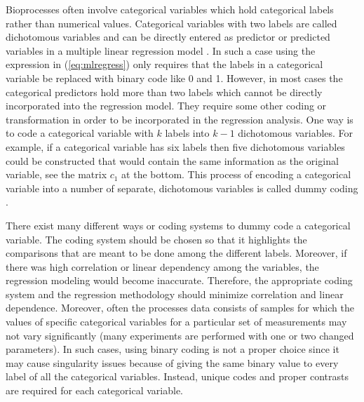 \documentclass{article}
\begin{document}
Bioprocesses often involve categorical variables which hold categorical labels rather than numerical values. %
Categorical variables with two labels are called dichotomous variables and can be directly entered as predictor or predicted variables in a multiple linear regression model \cite{ScaleUp_MLSP:stockburger01}. In such a case using the expression in (\ref{eq:mlregress}) only requires that the labels in a categorical variable be replaced with binary code like 0 and 1. However, in most cases the categorical predictors hold more than two labels which cannot be directly incorporated into the regression model. They require some other coding or transformation in order to be incorporated in the regression analysis. One way is to code a categorical variable with $k$ labels into $k-1$ dichotomous variables. For example, if a categorical variable has six %
labels then five dichotomous variables could be constructed that would contain the same information as the original variable, see %
the matrix $c_1$ at the bottom. This process of encoding a categorical variable into a number of separate, dichotomous variables is called dummy coding \cite{ScaleUp_MLSP:stockburger01}. 

There exist many different ways or coding systems to dummy code a categorical variable. The coding system should be chosen so that it highlights the comparisons that are meant to be done among the different labels. Moreover, if there was high correlation or linear dependency among the variables, the regression modeling would become inaccurate. Therefore, the appropriate coding system and the regression methodology should minimize correlation and linear dependence. %
Moreover, often the processes data consists of samples for which the values of specific categorical variables for a particular set of measurements may not vary significantly (many experiments are performed with one or two changed parameters). In such cases, using binary coding is not a proper choice since it may cause singularity issues because of giving the same binary value to every label of all the categorical variables. Instead, unique codes and proper contrasts are required for each categorical variable.
\end{document}
